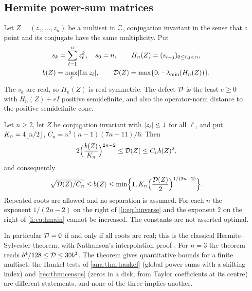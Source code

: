 \subsection{Hermite power-sum matrices}\label{li:sec:hermite}

Let $Z=(z_1,\dots,z_n)$ be a multiset in $\mathbb{C}$, conjugation invariant in the sense that a point and
its conjugate have the same multiplicity. Put
\begin{equation}\label{li:eq:hermite}
\begin{gathered}
 s_k=\sum_{\ell=1}^nz_\ell^k,\quad s_0=n,\qquad H_n(Z)=(s_{i+j})_{0\le i,j<n},\\
 b(Z)=\max_\ell\lvert\operatorname{Im} z_\ell\rvert,\qquad\mathcal{D}(Z)=\max\{0,-\lambda_{\min}(H_n(Z))\}.
\end{gathered}
\end{equation}
The $s_k$ are real, so $H_n(Z)$ is real symmetric. The defect $\mathcal{D}$ is the least $e\ge0$ with
$H_n(Z)+eI$ positive semidefinite, and also the operator-norm distance to the positive
semidefinite cone.

\begin{theorem}\label{li:thm:hermite}
Let $n\ge2$, let $Z$ be conjugation invariant with $\lvert z_\ell\rvert\le1$ for all $\ell$, and put
$K_n=4\lfloor n/2\rfloor$, $C_n=n^2(n-1)(7n-11)/6$. Then
\begin{equation}\label{li:eq:hmain}
 2\Bigl(\frac{b(Z)}{K_n}\Bigr)^{2n-2}\le\mathcal{D}(Z)\le C_nb(Z)^2 ,
\end{equation}
and consequently
\begin{equation}\label{li:eq:hinverse}
 \sqrt{\mathcal{D}(Z)/C_n}\le b(Z)\le\min\Bigl\{1,K_n\Bigl(\frac{\mathcal{D}(Z)}2\Bigr)^{1/(2n-2)}\Bigr\}.
\end{equation}
Repeated roots are allowed and no separation is assumed. For each $n$ the exponent $1/(2n-2)$ on
the right of \eqref{li:eq:hinverse} and the exponent $2$ on the right of \eqref{li:eq:hmain}
cannot be increased. The constants are not asserted optimal.
\end{theorem}

In particular $\mathcal{D}=0$ if and only if all roots are real; this is the classical Hermite--Sylvester
theorem, with Nathanson's interpolation proof \cite{Nathanson2021Hermite}. For $n=3$ the theorem
reads $b^4/128\le\mathcal{D}\le30b^2$. The theorem gives quantitative bounds for a finite multiset;
the Hankel tests of \cref{ana:thm:hankel} (global power sums with a shifting index) and
\cref{rec:thm:census} (zeros in a disk, from Taylor coefficients at its centre) are different
statements, and none of the three implies another.

